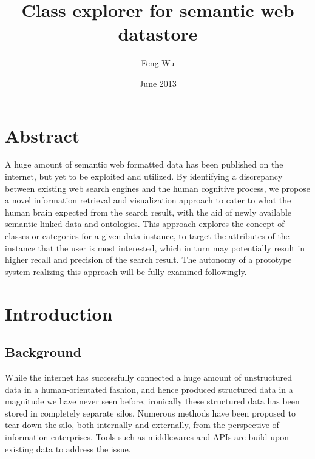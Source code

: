 \documentclass[12pt]{cls}
\title{Class explorer for semantic web datastore}
\author{Feng Wu}
\date{June 2013}
\begin{document}
\muntitlepage

\setcounter{secnumdepth}{3} \setcounter{tocdepth}{1}

 \setcounter{page}{0}

\doublespacing
\setlength{\topmargin}{-.5in}

\chapter*{Abstract}
A huge amount of semantic web formatted data has been published on the internet, but yet to be exploited and utilized. By identifying a discrepancy between existing web search engines and the human cognitive process, we propose a novel information retrieval and visualization approach to cater to what the human brain expected from the search result, with the aid of newly available semantic linked data and ontologies. This approach explores the concept of classes or categories for a given data instance, to target the attributes of the instance that the user is most interested, which in turn may potentially result in higher recall and precision of the search result. The autonomy of a prototype system realizing this approach will be fully examined followingly.



\renewcommand{\contentsname}{Table of Contents}
\tableofcontents{}

\doublespacing
\clearpage

\chapter{Introduction}
\setcounter{secnumdepth}{3} 
\pagestyle{myheadings}
\markboth{}{}\markright{} \rhead{\thepage} 
\pagestyle{myheadings} \rhead{\thepage}


\section{Background}

While the internet has successfully connected a huge amount of unstructured data in a human-orientated fashion, and hence produced structured data in a magnitude we have never seen before, ironically these structured data has been stored in completely separate silos. Numerous methods have been proposed to tear down the silo, both internally and externally, from the perspective of information enterprises. Tools such as middlewares and APIs are build upon existing data to address the issue.
\end{document}
